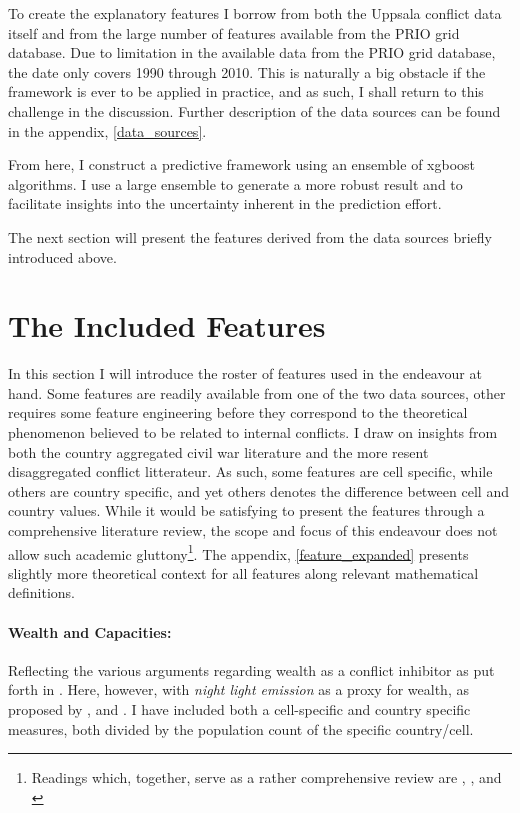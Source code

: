 \documentclass[a4paper]{article}
\begin{document}
To create the explanatory features I borrow from both the Uppsala conflict data itself and from the large number of features available from the PRIO grid database. Due to limitation in the available data from the PRIO grid database, the date only covers 1990 through 2010. This is naturally a big obstacle if the framework is ever to be applied in practice, and as such, I shall return to this challenge in the discussion. Further description of the data sources can be found in the appendix, \autoref{data_sources}.\par

From here, I construct a predictive framework using an ensemble of xgboost algorithms. I use a large ensemble to generate a more robust result and to facilitate insights into the uncertainty inherent in the prediction effort.\par

The next section will present the features derived from the data sources briefly introduced above.\par

\section{The Included Features}

In this section I will introduce the roster of features used in the endeavour at hand. Some features are readily available from one of the two data sources, other requires some feature engineering before they correspond to the theoretical phenomenon believed to be related to internal conflicts. I draw on insights from both the country aggregated civil war literature and the more resent disaggregated conflict litterateur. As such, some features are cell specific, while others are country specific, and yet others denotes the difference between cell and country values. While it would be satisfying to present the features through a comprehensive literature review, the scope and focus of this endeavour does not allow such academic gluttony\footnote{Readings which, together, serve as a rather comprehensive review are \cite{Hegre_Sambanis_2006}, \cite{Kalyvas_2007}, \cite{Cederman_Gleditsch_2009} and \cite{Blattman_Miguel_2010}}. The appendix, \autoref{feature_expanded} presents slightly more theoretical context for all features along relevant mathematical definitions.\par

\paragraph{Wealth and Capacities:} Reflecting the various arguments regarding wealth as a conflict inhibitor as put forth in \cite{Collier_Hoeffler_1998, Fearon_Laitin_2003, Collier_Hoeffler_2004}. Here, however, with \emph{night light emission} as a proxy for wealth, as proposed by \cite{Elvidge_2009}, \cite{Chen_Nordhuas_2011} and \cite{Cederman_Gleditsch_Buhaug_2013}. I have included both a cell-specific and country specific measures, both divided by the population count of the specific country/cell.\par
\end{document}
